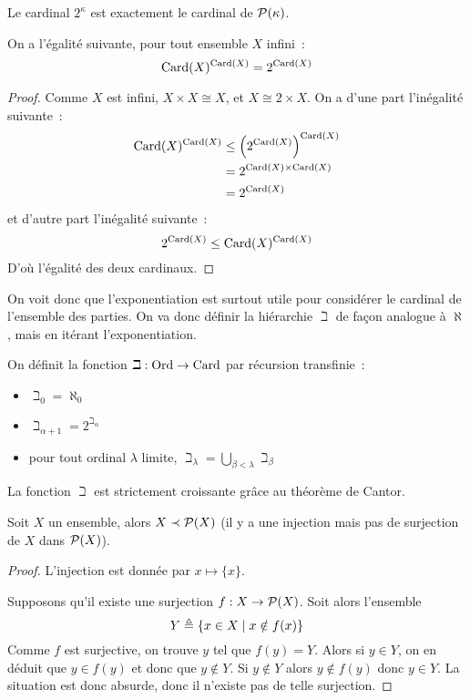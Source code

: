 \begin{remark}
  Le cardinal $2^\kappa$ est exactement le cardinal de $\mathcal{P}(\kappa)$.
\end{remark}

\begin{proposition}
  On a l'égalité suivante, pour tout ensemble $X$ infini~:
  \[\operatorname{Card}(X)^{\operatorname{Card}(X)} = 2^{\operatorname{Card}(X)}\]
\end{proposition}

\begin{proof}
  Comme $X$ est infini, $X\times X \cong X$, et $X \cong 2\times X$. On a d'une
  part l'inégalité suivante~:
  \begin{align*}
    \operatorname{Card}(X)^{\operatorname{Card}(X)} &\leq \left(2^{\operatorname{Card}(X)}\right)^{\operatorname{Card}(X)} \\
    &= 2^{\operatorname{Card}(X)\times\operatorname{Card}(X)} \\
    &= 2^{\operatorname{Card}(X)}
  \end{align*}
  et d'autre part l'inégalité suivante~: \[2^{\operatorname{Card}(X)}\leq \operatorname{Card}(X)^{\operatorname{Card}(X)}\]
  D'où l'égalité des deux cardinaux.
\end{proof}

On voit donc que l'exponentiation est surtout utile pour considérer le cardinal
de l'ensemble des parties. On va donc définir la hiérarchie $\beth$ de façon
analogue à $\aleph$, mais en itérant l'exponentiation.

\begin{definition}
  On définit la fonction $\beth : \operatorname{Ord} \to \operatorname{Card}$ par récursion transfinie~:
  \begin{itemize}
  \item $\beth_0 = \aleph_0$
  \item $\beth_{\alpha + 1} = 2^{\beth_\alpha}$
  \item pour tout ordinal $\lambda$ limite,
    $\displaystyle\beth_\lambda = \bigcup_{\beta < \lambda} \beth_\beta$
  \end{itemize}
\end{definition}

La fonction $\beth$ est strictement croissante grâce au théorème de Cantor.

\begin{theorem}
  Soit $X$ un ensemble, alors $X \prec \mathcal{P}(X)$ (il y a une injection mais
  pas de surjection de $X$ dans $\mathcal{P}(X)$).
\end{theorem}

\begin{proof}
  L'injection est donnée par $x \mapsto \{x\}$.

  Supposons qu'il existe une surjection $f : X \to \mathcal{P}(X)$. Soit alors
  l'ensemble
  \[Y\triangleq \{x\in X\mid x\notin f(x)\}\]
  Comme $f$ est surjective, on trouve $y$ tel que $f(y) = Y$. Alors si
  $y\in Y$, on en déduit que $y\in f(y)$ et donc que $y\notin Y$. Si
  $y\notin Y$ alors $y\notin f(y)$ donc $y\in Y$. La situation est donc absurde,
  donc il n'existe pas de telle surjection.
\end{proof}


